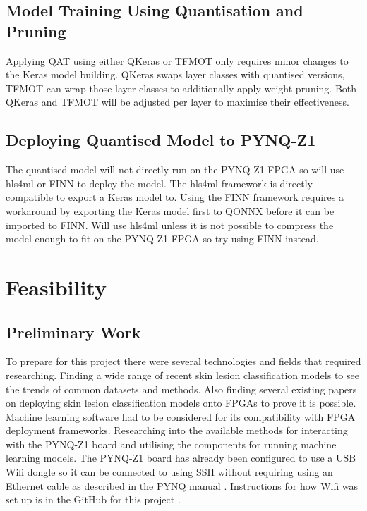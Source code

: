 \documentclass[12pt,nonacm,acmlarge,titlepage,screen]{acmart}
\begin{document}
	\subsection{Model Training Using Quantisation and Pruning}
	Applying QAT using either QKeras or TFMOT only requires minor changes to the Keras model building. QKeras swaps layer classes with quantised versions, TFMOT can wrap those layer classes to additionally apply weight pruning. Both QKeras and TFMOT will be adjusted per layer to maximise their effectiveness.

	\subsection{Deploying Quantised Model to PYNQ-Z1}
	The quantised model will not directly run on the PYNQ-Z1 FPGA so will use hls4ml or FINN to deploy the model. The hls4ml framework is directly compatible to export a Keras model to. Using the FINN framework requires a workaround by exporting the Keras model first to QONNX before it can be imported to FINN. Will use hls4ml unless it is not possible to compress the model enough to fit on the PYNQ-Z1 FPGA so try using FINN instead.
	
\section{Feasibility} \label{sec:feasiblity}
	\subsection{Preliminary Work}
	To prepare for this project there were several technologies and fields that required researching. Finding a wide range of recent skin lesion classification models to see the trends of common datasets and methods. Also finding several existing papers on deploying skin lesion classification models onto FPGAs to prove it is possible. Machine learning software had to be considered for its compatibility with FPGA deployment frameworks. Researching into the available methods for interacting with the PYNQ-Z1 board and utilising the components for running machine learning models. The PYNQ-Z1 board has already been configured to use a USB Wifi dongle so it can be connected to using SSH without requiring using an Ethernet cable as described in the PYNQ manual \cite{pynq_z1_man}. Instructions for how Wifi was set up is in the GitHub for this project \cite{this_git}.
\end{document}
